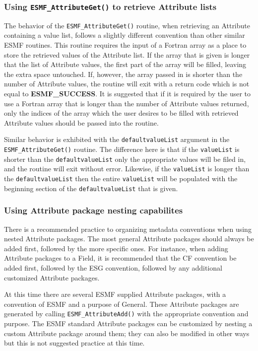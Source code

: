 \subsubsection{Using {\tt ESMF\_AttributeGet()} to retrieve Attribute lists}

The behavior of the {\tt ESMF\_AttributeGet()} routine, when retrieving an Attribute containing a value list, follows a slightly different convention than other similar ESMF routines.  This routine requires the input of a Fortran array as a place to store the retrieved values of the Attribute list.  If the array that is given is longer that the list of Attribute values, the first part of the array will be filled, leaving the extra space untouched.  If, however, the array passed in is shorter than the number of Attribute values, the routine will exit with a return code which is not equal to {\bf ESMF\_SUCCESS}.  It is suggested that if it is required by the user to use a Fortran array that is longer than the number of Attribute values returned, only the indices of the array which the user desires to be filled with retrieved Attribute values should be passed into the routine.  
  
\begin{sloppypar}
Similar behavior is exhibited with the {\tt defaultvalueList} argument in the {\tt ESMF\_AttributeGet()} routine.  The difference here is that if the {\tt valueList} is shorter than the {\tt defaultvalueList} only the appropriate values will be filed in, and the routine will exit without error.  Likewise, if the {\tt valueList} is longer than the {\tt defaultvalueList} then the entire {\tt valueList} will be populated with the beginning section of the {\tt defaultvalueList} that is given.  
\end{sloppypar}

\subsubsection{Using Attribute package nesting capabilites}

There is a recommended practice to organizing metadata conventions when using nested Attribute packages.  The most general Attribute packages should always be added first, followed by the more specific ones.  For instance, when adding Attribute packages to a Field, it is recommended that the CF convention be added first, followed by the ESG convention, followed by any additional customized Attribute packages.  

At this time there are several ESMF supplied Attribute packages, with a convention of ESMF and a purpose of General.  These Attribute packages are generated by calling {\tt ESMF\_AttributeAdd()} with the appropriate convention and purpose.  The ESMF standard Attribute packages can be customized by nesting a custom Attribute package around them; they can also be modified in other ways but this is not suggested practice at this time.

